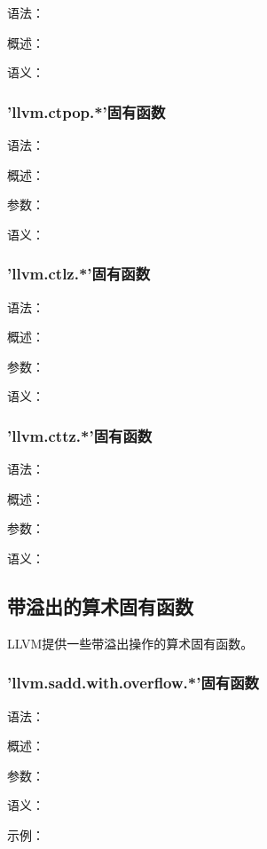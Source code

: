 \documentclass[12pt,a4paper]{article}
\begin{document}
{语法：

概述：

语义：


\subsubsection{'llvm.ctpop.*'固有函数} %

语法：

概述：

参数：

语义：


\subsubsection{'llvm.ctlz.*'固有函数} %

语法：

概述：

参数：

语义：


\subsubsection{'llvm.cttz.*'固有函数} %

语法：

概述：

参数：

语义：


\subsection{带溢出的算术固有函数}

LLVM提供一些带溢出操作的算术固有函数。

\subsubsection{'llvm.sadd.with.overflow.*'固有函数} %

语法：

概述：

参数：

语义：

示例：

}
\end{document}
